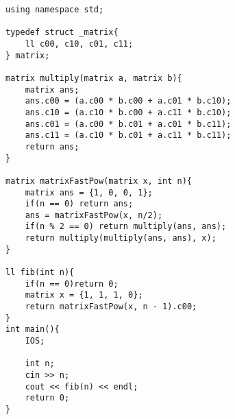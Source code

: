 \documentclass[12pt, a4paper]{article}
\begin{document}
\begin{enumerate}
\begin{lstlisting}
using namespace std;

typedef struct _matrix{
    ll c00, c10, c01, c11;   
} matrix;

matrix multiply(matrix a, matrix b){
    matrix ans;
    ans.c00 = (a.c00 * b.c00 + a.c01 * b.c10);
    ans.c10 = (a.c10 * b.c00 + a.c11 * b.c10);
    ans.c01 = (a.c00 * b.c01 + a.c01 * b.c11);
    ans.c11 = (a.c10 * b.c01 + a.c11 * b.c11);
    return ans;
}

matrix matrixFastPow(matrix x, int n){
    matrix ans = {1, 0, 0, 1};
    if(n == 0) return ans;
    ans = matrixFastPow(x, n/2);
    if(n % 2 == 0) return multiply(ans, ans);
    return multiply(multiply(ans, ans), x);
}

ll fib(int n){
    if(n == 0)return 0;
    matrix x = {1, 1, 1, 0};
    return matrixFastPow(x, n - 1).c00;
}
int main(){
    IOS;

    int n;
    cin >> n;
    cout << fib(n) << endl;
    return 0;
}
\end{lstlisting}
\end{enumerate}
\end{document}
